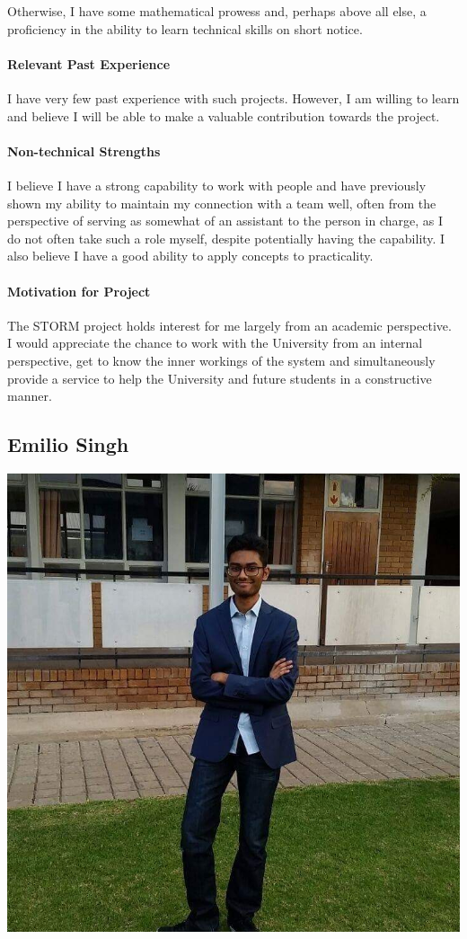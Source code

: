 \documentclass[12pt]{article}
\begin{document}
Otherwise, I have some mathematical prowess and, perhaps above all else, a proficiency in the ability to learn technical skills on short notice.
\paragraph{Relevant Past Experience}
I have very few past experience with such projects. However, I am willing to learn and believe I will be able to make a valuable contribution towards the project.

\paragraph{Non-technical Strengths}
I believe I have a strong capability to work with people and have previously shown my ability to maintain my connection with a team well, often from the perspective of serving as somewhat of an assistant to the person in charge, as I do not often take such a role myself, despite potentially having the capability. 
\newline I also believe I have a good ability to apply concepts to practicality.
\paragraph{Motivation for Project}
The STORM project holds interest for me largely from an academic perspective. I would appreciate the chance to work with the University from an internal perspective, get to know the inner workings of the system and simultaneously provide a service to help the University and future students in a constructive manner. 

\subsection{Emilio Singh}
\includegraphics[scale=0.2]{Emilio}
\end{document}
